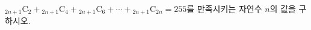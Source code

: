${}_{2n+1}\mathrm{C}_2+{}_{2n+1}\mathrm{C}_4+{}_{2n+1}\mathrm{C}_6+\cdots+{}_{2n+1}\mathrm{C}_{2n}=255$를 만족시키는 자연수 $n$의 값을 구하시오.
